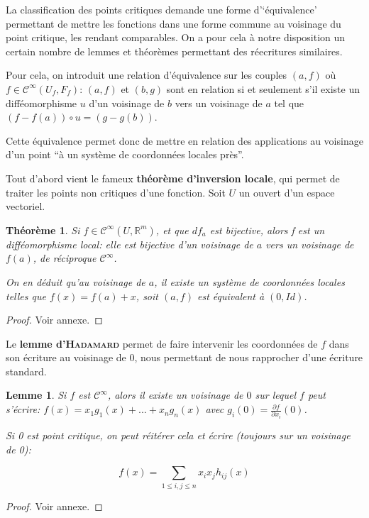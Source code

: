 \documentclass{article}
\newcommand{\cinf}{\mathcal{C}^\infty}
\newcommand{\R}{\mathbb{R}}
\newtheorem{thm}{Théorème}
\newtheorem{lemm}{Lemme}
\theoremstyle{definition}
\begin{document}
La classification des points critiques demande une forme d'`équivalence' permettant de mettre les fonctions dans une forme commune au voisinage du point critique, les rendant comparables.
On a pour cela à notre disposition un certain nombre de lemmes et théorèmes permettant des réecritures similaires.

Pour cela, on introduit une relation d'équivalence sur les couples $(a,f)$ où $f\in\cinf(U_f,F_f)$: $(a,f)$ et $(b,g)$ sont en relation si et seulement s'il existe un difféomorphisme $u$ d'un voisinage de $b$ vers un voisinage de $a$ tel que $(f-f(a))\circ u = (g-g(b))$.

Cette équivalence permet donc de mettre en relation des applications au voisinage d'un point ``à un système de coordonnées locales près''.

Tout d'abord vient le fameux \textbf{théorème d'inversion locale}, qui permet de traiter les points non critiques d'une fonction. Soit $U$ un ouvert d'un espace vectoriel.

\begin{thm}
Si $f\in\cinf(U,\R^m)$, et que $df_a$ est bijective, alors f est un difféomorphisme local: elle est bijective d'un voisinage de $a$ vers un voisinage de $f(a)$, de réciproque $\cinf$.

On en déduit qu'au voisinage de $a$, il existe un système de coordonnées locales telles que $f(x)=f(a)+x$, soit $(a,f)$ est équivalent à $(0,Id)$.
\end{thm}

\begin{proof} Voir annexe. \end{proof}

Le \textbf{lemme d'\textsc{Hadamard}} permet de faire intervenir les coordonnées de $f$ dans son écriture au voisinage de $0$, nous permettant de nous rapprocher d'une écriture standard.

\begin{lemm}
	Si $f$ est $\cinf$, alors il existe un voisinage de $0$ sur lequel $f$ peut s'écrire: $f(x)=x_1g_1(x)+...+x_ng_n(x)$ avec $g_i(0) = \frac{\partial f}{\partial x_i}(0)$.

	Si 0 est point critique, on peut réitérer cela et écrire (toujours sur un voisinage de 0):

	$$f(x)=\sum_{1\leq i,j \leq n} x_ix_jh_{ij}(x)$$
\end{lemm}

\begin{proof} Voir annexe. \end{proof}
\end{document}
